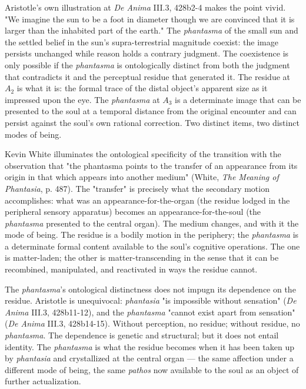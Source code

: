 \documentclass[12pt]{article}
\begin{document}
Aristotle's own illustration at \textit{De Anima} III.3, 428b2-4 makes the point vivid. "We imagine the sun to be a foot in diameter though we are convinced that it is larger than the inhabited part of the earth." The \textit{phantasma} of the small sun and the settled belief in the sun's supra-terrestrial magnitude coexist: the image persists unchanged while reason holds a contrary judgment. The coexistence is only possible if the \textit{phantasma} is ontologically distinct from both the judgment that contradicts it and the perceptual residue that generated it. The residue at $A_2$ is what it is: the formal trace of the distal object's apparent size as it impressed upon the eye. The \textit{phantasma} at $A_3$ is a determinate image that can be presented to the soul at a temporal distance from the original encounter and can persist against the soul's own rational correction. Two distinct items, two distinct modes of being.

Kevin White illuminates the ontological specificity of the transition with the observation that "the phantasma points to the transfer of an appearance from its origin in that which appears into another medium" (White, \textit{The Meaning of Phantasia}, p. 487). The "transfer" is precisely what the secondary motion accomplishes: what was an appearance-for-the-organ (the residue lodged in the peripheral sensory apparatus) becomes an appearance-for-the-soul (the \textit{phantasma} presented to the central organ). The medium changes, and with it the mode of being. The residue is a bodily motion in the periphery; the \textit{phantasma} is a determinate formal content available to the soul's cognitive operations. The one is matter-laden; the other is matter-transcending in the sense that it can be recombined, manipulated, and reactivated in ways the residue cannot.

The \textit{phantasma}'s ontological distinctness does not impugn its dependence on the residue. Aristotle is unequivocal: \textit{phantasia} "is impossible without sensation" (\textit{De Anima} III.3, 428b11-12), and the \textit{phantasma} "cannot exist apart from sensation" (\textit{De Anima} III.3, 428b14-15). Without perception, no residue; without residue, no \textit{phantasma}. The dependence is genetic and structural; but it does not entail identity. The \textit{phantasma} is what the residue becomes when it has been taken up by \textit{phantasia} and crystallized at the central organ --- the same affection under a different mode of being, the same \textit{pathos} now available to the soul as an object of further actualization.
\end{document}
